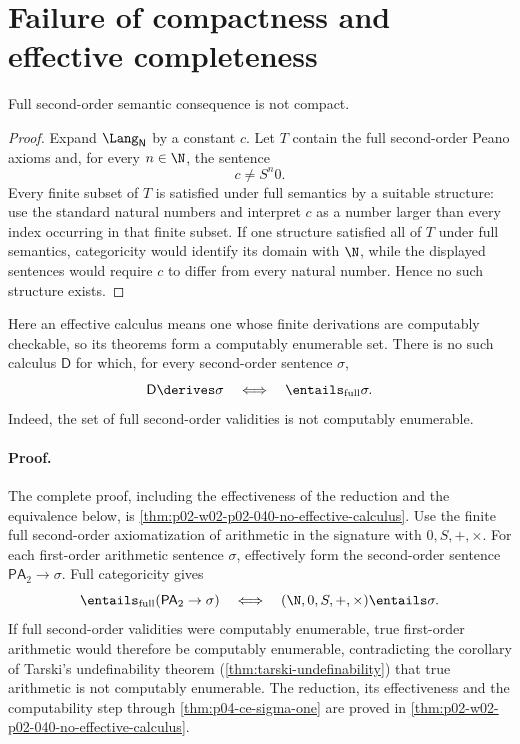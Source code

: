 \section{Failure of compactness and effective completeness}
\label{sec:second-order-logic-04}

\begin{theorem}
Full second-order semantic consequence is not compact.
\end{theorem}

\begin{proof}
Expand \(\Lang_{\mathsf N}\) by a constant \(c\).  Let \(T\) contain the full
second-order Peano axioms and, for every \(n\in\N\), the sentence
\[
  c\ne S^n0.
\]
Every finite subset of \(T\) is satisfied under full semantics by a suitable
structure: use the standard natural numbers and interpret \(c\) as a number
larger than every index occurring in that finite subset.  If one structure
satisfied all of \(T\) under full semantics, categoricity would identify its
domain with \(\N\), while the displayed sentences would require \(c\) to
differ from every natural number.  Hence no such structure exists.
\end{proof}

\begin{theorem}
Here an effective calculus means one whose finite derivations are
computably checkable, so its theorems form a computably enumerable set.  There
is no such calculus \(\mathsf D\) for which, for every second-order sentence
\(\sigma\),
\[
  \mathsf D\derives\sigma
  \quad\Longleftrightarrow\quad
  \entails_{\mathrm{full}}\sigma.
\]
Indeed, the set of full second-order validities is not computably enumerable.
\end{theorem}

\paragraph{Proof.}
The complete proof, including the effectiveness of the reduction and the
equivalence below, is \cref{thm:p02-w02-p02-040-no-effective-calculus}.
Use the finite full second-order axiomatization of arithmetic in the signature
with \(0,S,+,\times\).  For each first-order arithmetic sentence \(\sigma\),
effectively form the second-order sentence
\(\mathsf{PA}_2\to\sigma\).  Full categoricity gives
\[
  \entails_{\mathrm{full}}(\mathsf{PA}_2\to\sigma)
  \quad\Longleftrightarrow\quad
  (\N,0,S,+,\times)\entails\sigma.
\]
If full second-order validities were computably enumerable, true
first-order arithmetic would therefore be computably enumerable,
contradicting the corollary of Tarski's undefinability theorem
(\cref{thm:tarski-undefinability}) that true arithmetic is not computably
enumerable.  The reduction, its effectiveness and the computability step
through \cref{thm:p04-ce-sigma-one} are proved in
\cref{thm:p02-w02-p02-040-no-effective-calculus}.


